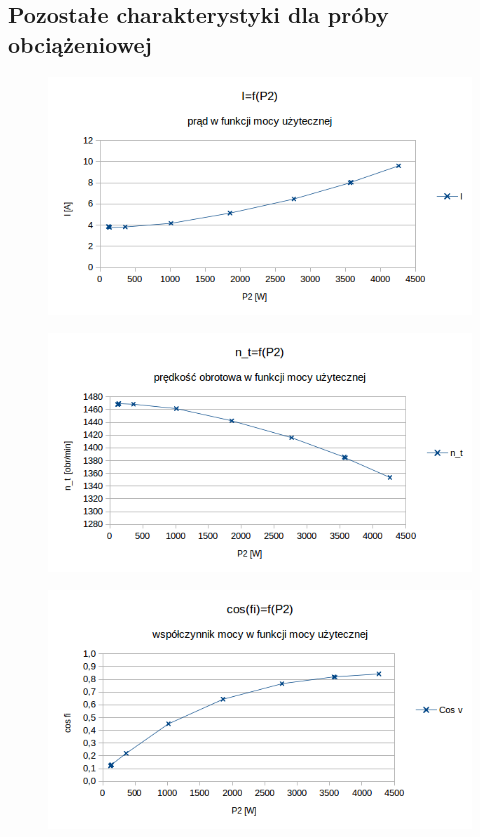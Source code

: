 \documentclass[12pt]{article}
\begin{document}
\subsection{Pozostałe charakterystyki dla próby obciążeniowej}
	\begin{figure}[H]
			\centering
			\includegraphics[width=9 cm]{wykresy/o_prad}
	\end{figure}
	\begin{figure}[H]
			\centering
			\includegraphics[width=9 cm]{wykresy/o_obroty}
	\end{figure}
	\nopagebreak
	\begin{figure}[H]
			\centering
			\includegraphics[width=9 cm]{wykresy/o_fi}
	\end{figure}
	
	
\end{document}
